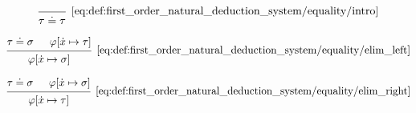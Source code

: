 \begin{definition}
\begin{thmenum}
    \begin{minipage}{0.3\textwidth}
      \begin{equation*}\taglabel[\ensuremath{ \syneq^+ }]{eq:def:first_order_natural_deduction_system/equality/intro}
        \begin{prooftree}
          \infer0[\ref{eq:def:first_order_natural_deduction_system/equality/intro}]{ \tau \syneq \tau }
        \end{prooftree}
      \end{equation*}
    \end{minipage}
    \hfill
    \begin{minipage}{0.3\textwidth}
      \begin{equation*}\taglabel[\ensuremath{ \syneq_L^- }]{eq:def:first_order_natural_deduction_system/equality/elim_left}
        \begin{prooftree}
          \hypo{ \tau \syneq \sigma }
          \hypo{ \varphi[\synx \mapsto \tau] }
          \infer2[\ref{eq:def:first_order_natural_deduction_system/equality/elim_left}]{ \varphi[\synx \mapsto \sigma] }
        \end{prooftree}
      \end{equation*}
    \end{minipage}
    \hfill
    \begin{minipage}{0.3\textwidth}
      \begin{equation*}\taglabel[\ensuremath{ \syneq_L^+ }]{eq:def:first_order_natural_deduction_system/equality/elim_right}
        \begin{prooftree}
          \hypo{ \tau \syneq \sigma }
          \hypo{ \varphi[\synx \mapsto \sigma] }
          \infer2[\ref{eq:def:first_order_natural_deduction_system/equality/elim_right}]{ \varphi[\synx \mapsto \tau] }
        \end{prooftree}
      \end{equation*}
    \end{minipage}
  \end{thmenum}
\end{definition}

